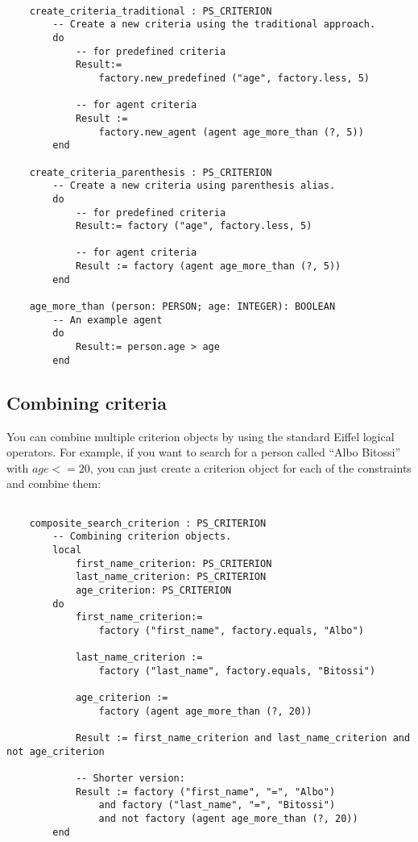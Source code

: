 \documentclass[a4paper,12pt]{report}
\begin{document}
\begin{lstlisting}[language=OOSC2Eiffel, captionpos=b, caption={Different ways of creating criteria.}, label={lst:factory_usage}]

	create_criteria_traditional : PS_CRITERION
		-- Create a new criteria using the traditional approach.
		do
			-- for predefined criteria
			Result:= 
				factory.new_predefined ("age", factory.less, 5)

			-- for agent criteria
			Result := 
				factory.new_agent (agent age_more_than (?, 5))
		end

	create_criteria_parenthesis : PS_CRITERION
		-- Create a new criteria using parenthesis alias.
		do
			-- for predefined criteria
			Result:= factory ("age", factory.less, 5)

			-- for agent criteria
			Result := factory (agent age_more_than (?, 5))
		end			

	age_more_than (person: PERSON; age: INTEGER): BOOLEAN
		-- An example agent
		do
			Result:= person.age > age
		end

\end{lstlisting}

\subsection{Combining criteria}

You can combine multiple criterion objects by using the standard Eiffel logical operators. 
For example, if you want to search for a person called ``Albo Bitossi'' with $age <= 20$, you can just create a criterion object for each of the constraints and combine them:  

\begin{lstlisting}[language=OOSC2Eiffel, captionpos=b, caption={Combining criteria.}, label={lst:search_albo_bitossi}]

	composite_search_criterion : PS_CRITERION
		-- Combining criterion objects.
		local
			first_name_criterion: PS_CRITERION
			last_name_criterion: PS_CRITERION
			age_criterion: PS_CRITERION
		do
			first_name_criterion:= 
				factory ("first_name", factory.equals, "Albo")

			last_name_criterion := 
				factory ("last_name", factory.equals, "Bitossi")

			age_criterion := 
				factory (agent age_more_than (?, 20))
			
			Result := first_name_criterion and last_name_criterion and not age_criterion

			-- Shorter version: 
			Result := factory ("first_name", "=", "Albo") 
				and factory ("last_name", "=", "Bitossi") 
				and not factory (agent age_more_than (?, 20))
		end
\end{lstlisting}
\end{document}

